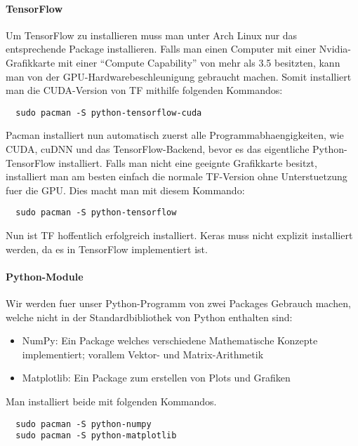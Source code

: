 \paragraph{TensorFlow}
Um TensorFlow zu installieren muss man unter Arch Linux nur das entsprechende
Package installieren.
Falls man einen Computer mit einer Nvidia-Grafikkarte mit einer ``Compute
Capability'' von mehr als 3.5 besitzten, kann man von der
GPU-Hardwarebeschleunigung gebraucht machen. Somit installiert man die
CUDA-Version von TF mithilfe folgenden Kommandos:
\begin{verbatim}
  sudo pacman -S python-tensorflow-cuda
\end{verbatim}
Pacman installiert nun automatisch zuerst alle Programmabhaengigkeiten, wie
CUDA, cuDNN und das TensorFlow-Backend, bevor es das eigentliche
Python-TensorFlow installiert.
\para{}
Falls man nicht eine geeignte Grafikkarte besitzt, installiert man am besten
einfach die normale TF-Version ohne Unterstuetzung fuer die GPU. Dies macht man
mit diesem Kommando:
\begin{verbatim}
  sudo pacman -S python-tensorflow
\end{verbatim}
\para{}
Nun ist TF hoffentlich erfolgreich installiert. Keras muss nicht explizit
installiert werden, da es in TensorFlow implementiert ist.

\paragraph{Python-Module}
Wir werden fuer unser Python-Programm von zwei Packages Gebrauch machen, welche
nicht in der Standardbibliothek von Python enthalten sind:
\begin{itemize}
\item{NumPy: Ein Package welches verschiedene Mathematische Konzepte
    implementiert; vorallem Vektor- und Matrix-Arithmetik}
\item{Matplotlib: Ein Package zum erstellen von Plots und Grafiken}
\end{itemize}

Man installiert beide mit folgenden Kommandos.
\begin{verbatim}
  sudo pacman -S python-numpy
  sudo pacman -S python-matplotlib
\end{verbatim}

